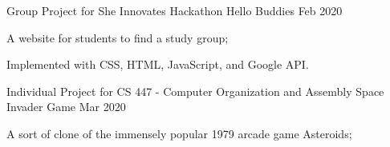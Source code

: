 
\begin{cventries}
  \cventry
    {Group Project for She Innovates Hackathon} %
    {Hello Buddies} %
    {} %
    {Feb 2020} %
    {
      \begin{cvitems} %
        \item {A website for students to find a study group;}
		\item {Implemented with CSS, HTML, JavaScript, and Google API.}
      \end{cvitems}
    }

  \cventry
    {Individual Project for CS 447 - Computer Organization and Assembly} %
    {Space Invader Game} %
    {} %
    {Mar 2020} %
    {
      \begin{cvitems}
        \item {A sort of clone of the immensely popular 1979 arcade game Asteroids;} 
      \end{cvitems}
    }
\end{cventries}